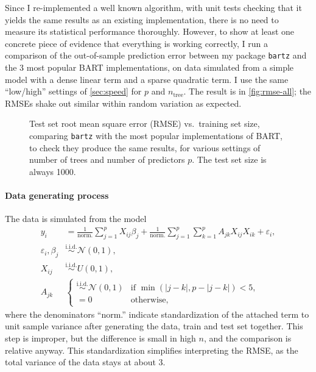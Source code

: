 \documentclass{article}
\newcommand{\widecenter}[1]{\noindent\hspace{-\textwidth}\makebox[3\textwidth][c]{#1}}
\newcommand{\includempl}[1]{\texttt{[image: \#1]}}
\let\oldmarginpar\marginpar
\renewcommand{\marginpar}[1]{\oldmarginpar{\sffamily\scriptsize #1}}
\renewcommand{\marginpar}[1]{\relax} %
\begin{document}
    Since I re-implemented a well known algorithm, with unit tests checking that it yields the same results as an existing implementation, there is no need to measure its statistical performance thoroughly. However, to show at least one concrete piece of evidence that everything is working correctly, I run a comparison of the out-of-sample prediction error\marginpar{Measure also coverage.} between my package \texttt{bartz} and the 3 most popular BART implementations, on data simulated from a simple model with a dense linear term and a sparse quadratic term. I use the same ``low/high'' settings of \autoref{sec:speed} for $p$ and $n_\text{tree}$. The result is in \autoref{fig:rmse-all}; the RMSEs shake out similar within random variation as expected.

    \begin{figure}
        \widecenter{\includempl{rmse-all}}
        \caption{\label{fig:rmse-all} Test set root mean square error (RMSE) vs.\ training set size, comparing \texttt{bartz} with the most popular implementations of BART, to check they produce the same results, for various settings of number of trees and number of predictors $p$. The test set size is always 1000.}
    \end{figure}

    \paragraph{Data generating process}

    The data is simulated from the model
    \begin{align}
        y_i &= \frac 1{\text{norm.}} \sum_{j=1}^p X_{ij} \beta_j + \frac 1{\text{norm.}} \sum_{j=1}^p \sum_{k=1}^p A_{jk} X_{ij} X_{ik} + \varepsilon_i, \label{eq:rmsedgp} \\
        \varepsilon_i, \beta_j &\overset{\text{i.i.d.}}{\sim} \mathcal N(0, 1), \\
        X_{ij} &\overset{\text{i.i.d.}}{\sim} U(0, 1), \\
        A_{jk} &\begin{cases}
            \overset{\text{i.i.d.}}{\sim} \mathcal N(0, 1) & \text{if $\min(|j - k|, p - |j - k|) < 5$}, \\
            =0 & \text{otherwise},
        \end{cases}
    \end{align}
    where the denominators ``norm.'' indicate standardization of the attached term to unit sample variance after generating the data, train and test set together. This step is improper, but the difference is small in high $n$, and the comparison is relative anyway. This standardization simplifies interpreting the RMSE, as the total variance of the data stays at about 3.
\end{document}
